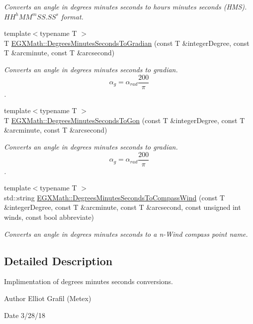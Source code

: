\begin{DoxyCompactItemize}
\begin{DoxyCompactList}\small\item\em Converts an angle in degrees minutes seconds to hours minutes seconds (H\+MS). ${HH}^h{MM}^m{SS.SS}^s$ format. \end{DoxyCompactList}\item 
{\footnotesize template$<$typename T $>$ }\\T \mbox{\hyperlink{group___e_g_x_math-_conversions-_angle_conversions-_degrees_minutes_seconds_ga59e2c2b178f760c337fcb3ea7406570f}{E\+G\+X\+Math\+::\+Degrees\+Minutes\+Seconds\+To\+Gradian}} (const T \&integer\+Degree, const T \&arcminute, const T \&arcsecond)
\begin{DoxyCompactList}\small\item\em Converts an angle in degrees minutes seconds to gradian. \[\alpha_{g}=\alpha_{rad}\frac{200}{\pi}\]. \end{DoxyCompactList}\item 
{\footnotesize template$<$typename T $>$ }\\T \mbox{\hyperlink{group___e_g_x_math-_conversions-_angle_conversions-_degrees_minutes_seconds_ga90b481c224ad083726ffe0fd35f4dbfc}{E\+G\+X\+Math\+::\+Degrees\+Minutes\+Seconds\+To\+Gon}} (const T \&integer\+Degree, const T \&arcminute, const T \&arcsecond)
\begin{DoxyCompactList}\small\item\em Converts an angle in degrees minutes seconds to gradian. \[\alpha_{g}=\alpha_{rad}\frac{200}{\pi}\]. \end{DoxyCompactList}\item 
{\footnotesize template$<$typename T $>$ }\\std\+::string \mbox{\hyperlink{group___e_g_x_math-_conversions-_angle_conversions-_degrees_minutes_seconds_ga756ecf42a02c09344bc8a9ad67845168}{E\+G\+X\+Math\+::\+Degrees\+Minutes\+Seconds\+To\+Compass\+Wind}} (const T \&integer\+Degree, const T \&arcminute, const T \&arcsecond, const unsigned int winds, const bool abbreviate)
\begin{DoxyCompactList}\small\item\em Converts an angle in degrees minutes seconds to a n-\/\+Wind compass point name. \end{DoxyCompactList}\end{DoxyCompactItemize}


\subsection{Detailed Description}
Implimentation of degrees minutes seconds conversions. 

\begin{DoxyAuthor}{Author}
Elliot Grafil (Metex) 
\end{DoxyAuthor}
\begin{DoxyDate}{Date}
3/28/18 
\end{DoxyDate}
